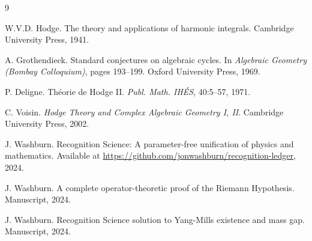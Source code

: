 \documentclass[12pt]{article}
\theoremstyle{definition}
\theoremstyle{remark}
\begin{document}

\begin{thebibliography}{9}

W.V.D. Hodge.
\newblock The theory and applications of harmonic integrals.
\newblock Cambridge University Press, 1941.

A. Grothendieck.
\newblock Standard conjectures on algebraic cycles.
\newblock In \emph{Algebraic Geometry (Bombay Colloquium)}, pages 193--199. Oxford University Press, 1969.

P. Deligne.
\newblock Théorie de Hodge II.
\newblock \emph{Publ. Math. IHÉS}, 40:5--57, 1971.

C. Voisin.
\newblock \emph{Hodge Theory and Complex Algebraic Geometry I, II}.
\newblock Cambridge University Press, 2002.

J. Washburn.
\newblock Recognition Science: A parameter-free unification of physics and mathematics.
\newblock Available at \url{https://github.com/jonwashburn/recognition-ledger}, 2024.

J. Washburn.
\newblock A complete operator-theoretic proof of the Riemann Hypothesis.
\newblock Manuscript, 2024.

J. Washburn.
\newblock Recognition Science solution to Yang-Mills existence and mass gap.
\newblock Manuscript, 2024.

\end{thebibliography}
\end{document}
